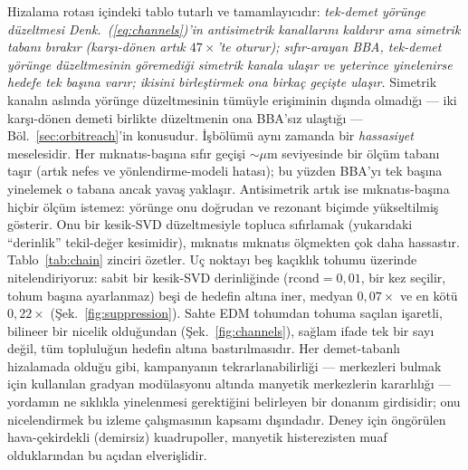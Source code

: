 \documentclass[aps,prab,reprint,superscriptaddress,nofootinbib]{revtex4-2}
\begin{document}
Hizalama rotası içindeki tablo tutarlı ve tamamlayıcıdır: \emph{tek-demet yörünge
düzeltmesi Denk.~(\ref{eq:channels})'in antisimetrik kanallarını kaldırır ama
simetrik tabanı bırakır (karşı-dönen artık $47\times$'te oturur); sıfır-arayan BBA,
tek-demet yörünge düzeltmesinin göremediği simetrik kanala ulaşır ve yeterince
yinelenirse hedefe tek başına varır; ikisini birleştirmek ona birkaç geçişte
ulaşır.} Simetrik kanalın aslında yörünge düzeltmesinin tümüyle erişiminin dışında
olmadığı --- iki karşı-dönen demeti birlikte düzeltmenin ona BBA'sız ulaştığı ---
Böl.~\ref{sec:orbitreach}'in konusudur. İşbölümü aynı zamanda bir \emph{hassasiyet}
meselesidir. Her mıknatıs-başına sıfır geçişi $\sim\!\mu$m seviyesinde bir ölçüm
tabanı taşır (artık nefes ve yönlendirme-modeli hatası); bu yüzden BBA'yı tek başına
yinelemek o tabana ancak yavaş yaklaşır. Antisimetrik artık ise mıknatıs-başına
hiçbir ölçüm istemez: yörünge onu doğrudan ve rezonant biçimde yükseltilmiş gösterir.
Onu bir kesik-SVD düzeltmesiyle topluca sıfırlamak (yukarıdaki ``derinlik'' tekil-değer
kesimidir), mıknatıs mıknatıs ölçmekten çok daha hassastır. Tablo~\ref{tab:chain}
zinciri özetler. Uç noktayı beş kaçıklık tohumu üzerinde nitelendiriyoruz: sabit bir
kesik-SVD derinliğinde ($\mathrm{rcond}=0{,}01$, bir kez seçilir, tohum başına
ayarlanmaz) beşi de hedefin altına iner, medyan $0{,}07\times$ ve en kötü
$0{,}22\times$ (Şek.~\ref{fig:suppression}). Sahte EDM tohumdan tohuma saçılan
işaretli, bilineer bir nicelik olduğundan (Şek.~\ref{fig:channels}), sağlam ifade
tek bir sayı değil, tüm topluluğun hedefin altına bastırılmasıdır. Her demet-tabanlı
hizalamada olduğu gibi, kampanyanın tekrarlanabilirliği --- merkezleri bulmak için
kullanılan gradyan modülasyonu altında manyetik merkezlerin kararlılığı --- yordamın
ne sıklıkla yinelenmesi gerektiğini belirleyen bir donanım girdisidir; onu
nicelendirmek bu izleme çalışmasının kapsamı dışındadır. Deney için öngörülen
hava-çekirdekli (demirsiz) kuadrupoller, manyetik histerezisten muaf olduklarından
bu açıdan elverişlidir.
\end{document}
